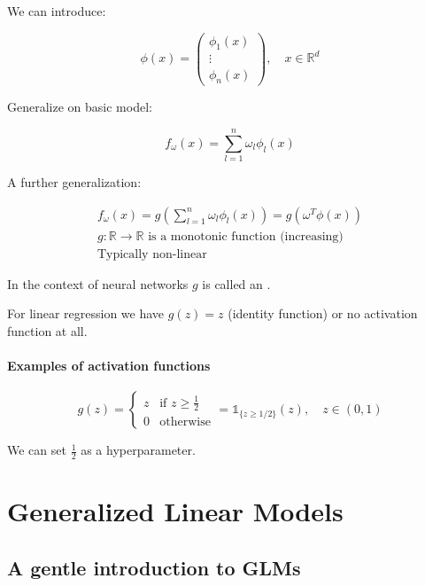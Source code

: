 We can introduce:

\begin{equation*}
	\phi (x) = \left(\begin{array}{c}
			\phi_1(x) \\
			\vdots    \\
			\phi_n(x)
		\end{array}\right), \quad x \in \mathds{R}^d
\end{equation*}

Generalize on basic model:

\begin{equation}
	\boxed{f_\omega(x) = \sum_{l=1}^n \omega_l \phi_l(x)}
\end{equation}

A further generalization:

\begin{align*}
	f_\omega(x) = g\left(\sum_{l=1}^n \omega_l \phi_l(x)\right) = g\left(\omega^T\phi(x)\right) \\
	g: \mathds{R} \to \mathds{R} \text{ is a monotonic function (increasing)}                   \\
	\text{Typically non-linear}
\end{align*}

In the context of neural networks $g$ is called an .

For linear regression we have $g(z) = z$ (identity function) or
no activation function at all.

\paragraph{Examples of activation functions}

\begin{equation*}
	g(z) = \begin{cases}
		z & \text{if } z \geq \frac{1}{2} \\
		0 & \text{otherwise}
	\end{cases}  = \mathds{1}_{\{z \geq 1/2\}}(z), \quad z \in (0, 1)
\end{equation*}

We can set $\frac{1}{2}$ as a hyperparameter.

\section{Generalized Linear Models}
\subsection{A gentle introduction to GLMs}

